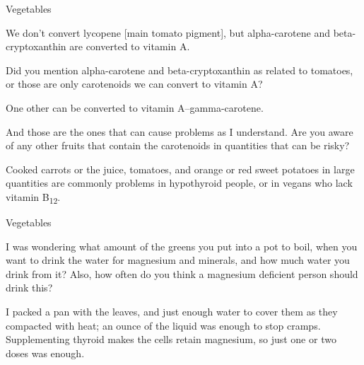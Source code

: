 \documentclass[11pt,oneside,openany,extrafontsizes]{memoir}
\begin{document}
\begin{emailexchange}{Vegetables}

    \begin{answer}
        We don't convert lycopene [main tomato pigment], but alpha-carotene and beta-cryptoxanthin are converted to vitamin A.
    \end{answer}

    \begin{question}
        Did you mention alpha-carotene and beta-cryptoxanthin as related to tomatoes, or those are only carotenoids we can convert to vitamin A?
    \end{question}

    \begin{answer}
        One other can be converted to vitamin A--gamma-carotene.
    \end{answer}

    \begin{question}
        And those are the ones that can cause problems as I understand. Are you aware of any other fruits that contain the carotenoids in quantities that can be risky?
    \end{question}

    \begin{answer}
        Cooked carrots or the juice, tomatoes, and orange or red sweet potatoes in large quantities are commonly problems in hypothyroid people, or in vegans who lack vitamin B\textsubscript{12}.
    \end{answer}
\end{emailexchange}

\begin{qaexchange}{Vegetables}

    \begin{question}
        I was wondering what amount of the greens you put into a pot to boil, when you want to drink the water for magnesium and minerals, and how much water you drink from it? Also, how often do you think a magnesium deficient person should drink this?
    \end{question}

    \begin{answer}
       I packed a pan with the leaves, and just enough water to cover them as they compacted with heat; an ounce of the liquid was enough to stop cramps. Supplementing thyroid makes the cells retain magnesium, so just one or two doses was enough. 
    \end{answer}
\end{qaexchange}
\end{document}
